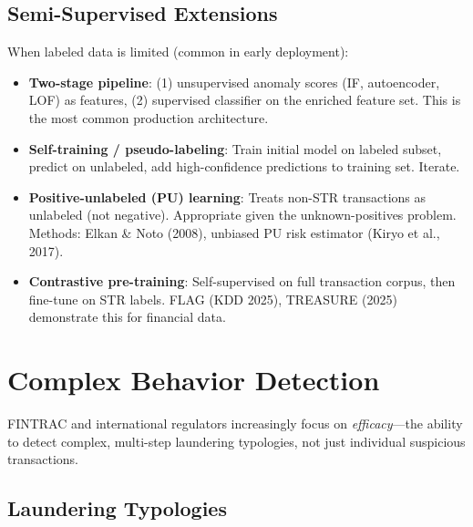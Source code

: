 \documentclass[11pt]{article}
\begin{document}
\subsection{Semi-Supervised Extensions}

When labeled data is limited (common in early deployment):
\begin{itemize}
\item \textbf{Two-stage pipeline}: (1) unsupervised anomaly scores (IF, autoencoder, LOF) as features, (2) supervised classifier on the enriched feature set. This is the most common production architecture.
\item \textbf{Self-training / pseudo-labeling}: Train initial model on labeled subset, predict on unlabeled, add high-confidence predictions to training set. Iterate.
\item \textbf{Positive-unlabeled (PU) learning}: Treats non-STR transactions as unlabeled (not negative). Appropriate given the unknown-positives problem. Methods: Elkan \& Noto (2008), unbiased PU risk estimator (Kiryo et al., 2017).
\item \textbf{Contrastive pre-training}: Self-supervised on full transaction corpus, then fine-tune on STR labels. FLAG (KDD 2025), TREASURE (2025) demonstrate this for financial data.
\end{itemize}

\section{Complex Behavior Detection}

FINTRAC and international regulators increasingly focus on \emph{efficacy}---the ability to detect complex, multi-step laundering typologies, not just individual suspicious transactions.

\subsection{Laundering Typologies}
\end{document}
